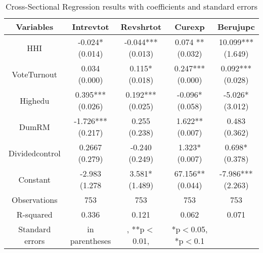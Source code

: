 \begin{table}[ht]
\centering
\begin{tabular}{|ccccc|}
\hline
\textbf{Variables} & \textbf{Intrevtot} & \textbf{Revshrtot} & \textbf{Curexp} & \textbf{Berujupc} \\
\hline
HHI & \makecell{-0.024* \\ (0.014)} & \makecell{-0.044*** \\ (0.013)} & \makecell{0.074 **\\ (0.032)} & \makecell{10.099*** \\ (1.649)} \\

VoteTurnout& \makecell{0.034 \\ (0.000)} & \makecell{0.115* \\ (0.018)} & \makecell{0.247***\\ (0.000)} & \makecell{0.092*** \\ (0.028)} \\

Highedu & \makecell{0.395*** \\ (0.026)} & \makecell{0.192*** \\ (0.025)} & \makecell{-0.096* \\ (0.058)} & \makecell{-5.026* \\ (3.012)} \\
DumRM & \makecell{-1.726*** \\ (0.217)} & \makecell{0.255\\ (0.238)} & \makecell{1.622**\\ (0.007)} & \makecell{0.483 \\ (0.362)} \\
Dividedcontrol & \makecell{0.2667 \\ (0.279)} & \makecell{-0.240\\ (0.249)} & \makecell{1.323*\\ (0.007)} & \makecell{0.698*\\ (0.378)} \\
Constant & \makecell{-2.983 \\ (1.278} & \makecell{3.581* \\ (1.489)} & \makecell{67.156** \\ (0.044)} & \makecell{-7.986*** \\ (2.263)} \\\hline

Observations & 753 & 753 & 753 & 753 \\
\hline
R-squared &0.336 & 0.121 & 0.062 & 0.071 \\
\hline
\footnotesize Standard errors& \footnotesize in parentheses&, \footnotesize***p$<$0.01, &\footnotesize **p$<$0.05, *p$<$0.1\\
\end{tabular}
\caption{Cross-Sectional Regression results with coefficients and standard errors}
\label{tab:coefficients_with_se}
\end{table}